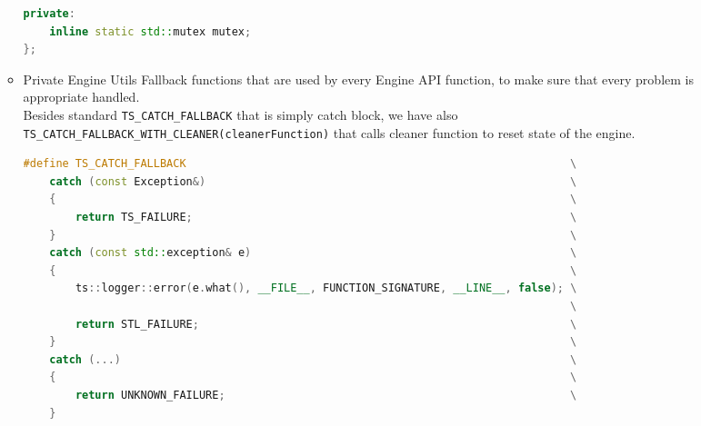 \begin{itemize}
\begin{itemize}
\begin{lstlisting}[language=c++, caption=Singleton of Public Engine Utils(./engine/include/tsengine/utils.hpp)]
private:
    inline static std::mutex mutex;
};
\end{lstlisting}
        \item Private Engine Utils
Fallback functions that are used by every Engine API function, to make sure that every problem is appropriate handled.\\
\label{sec:fallbacks}
Besides standard \texttt{TS\_CATCH\_FALLBACK} that is simply catch block, we have also \texttt{TS\_CATCH\_FALLBACK\_WITH\_CLEANER(cleanerFunction)} that calls cleaner function to reset state of the engine.
\begin{lstlisting}[language=c++, caption=Private Engine Utils (./engine/src/internal\_utils.h)]
#define TS_CATCH_FALLBACK                                                           \
    catch (const Exception&)                                                        \
    {                                                                               \
        return TS_FAILURE;                                                          \
    }                                                                               \
    catch (const std::exception& e)                                                 \
    {                                                                               \
        ts::logger::error(e.what(), __FILE__, FUNCTION_SIGNATURE, __LINE__, false); \
                                                                                    \
        return STL_FAILURE;                                                         \
    }                                                                               \
    catch (...)                                                                     \
    {                                                                               \
        return UNKNOWN_FAILURE;                                                     \
    }


\end{lstlisting}
\end{itemize}
\end{itemize}

